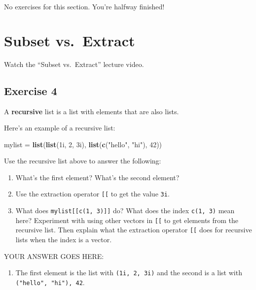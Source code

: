 \documentclass[
]{article}
\newenvironment{Shaded}{\begin{snugshade}}{\end{snugshade}}
\newcommand{\DecValTok}[1]{\textcolor[rgb]{0.00,0.00,0.81}{#1}}
\newcommand{\KeywordTok}[1]{\textcolor[rgb]{0.13,0.29,0.53}{\textbf{#1}}}
\newcommand{\NormalTok}[1]{#1}
\newcommand{\StringTok}[1]{\textcolor[rgb]{0.31,0.60,0.02}{#1}}
\providecommand{\tightlist}{%
  \setlength{\itemsep}{0pt}\setlength{\parskip}{0pt}}
\begin{document}
No exercises for this section. You're halfway finished!

\hypertarget{subset-vs.-extract}{%
\section{Subset vs.~Extract}\label{subset-vs.-extract}}

Watch the ``Subset vs.~Extract'' lecture video.

\hypertarget{exercise-4}{%
\subsection{Exercise 4}\label{exercise-4}}

A \textbf{recursive} list is a list with elements that are also lists.

Here's an example of a recursive list:

\begin{Shaded}
\begin{Highlighting}[]
\NormalTok{mylist =}\StringTok{ }\KeywordTok{list}\NormalTok{(}\KeywordTok{list}\NormalTok{(1i, }\DecValTok{2}\NormalTok{, 3i), }\KeywordTok{list}\NormalTok{(}\KeywordTok{c}\NormalTok{(}\StringTok{"hello"}\NormalTok{, }\StringTok{"hi"}\NormalTok{), }\DecValTok{42}\NormalTok{))}
\end{Highlighting}
\end{Shaded}

Use the recursive list above to answer the following:

\begin{enumerate}
\def\labelenumi{\arabic{enumi}.}
\item
  What's the first element? What's the second element?
\item
  Use the extraction operator \texttt{{[}{[}} to get the value
  \texttt{3i}.
\item
  What does \texttt{mylist{[}{[}c(1,\ 3){]}{]}} do? What does the index
  \texttt{c(1,\ 3)} mean here? Experiment with using other vectors in
  \texttt{{[}{[}} to get elements from the recursive list. Then explain
  what the extraction operator \texttt{{[}{[}} does for recursive lists
  when the index is a vector.
\end{enumerate}

YOUR ANSWER GOES HERE:

\begin{enumerate}
\def\labelenumi{\arabic{enumi}.}
\tightlist
\item
  The first element is the list with \texttt{(1i,\ 2,\ 3i)} and the
  second is a list with \texttt{("hello",\ "hi"),\ 42}.
\end{enumerate}
\end{document}
